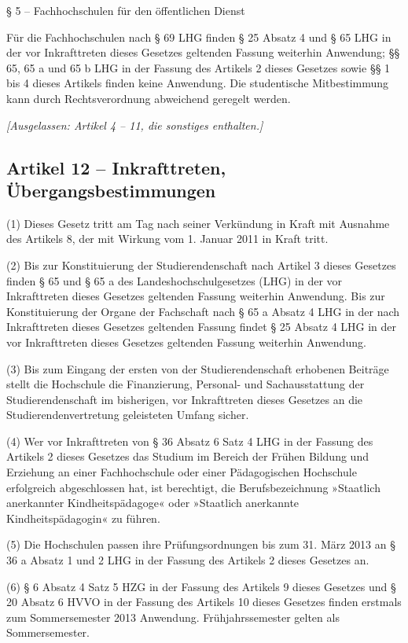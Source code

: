 \documentclass[
10pt,
a4paper,
twoside,								%
titlepage=false,							%
draft=false								%
]{scrartcl}
\begin{document}
§ 5 – Fachhochschulen für den öffentlichen Dienst

Für die Fachhochschulen nach § 69 LHG finden § 25 Absatz 4 und § 65 LHG in der vor Inkrafttreten dieses Gesetzes geltenden Fassung weiterhin Anwendung; §§ 65, 65 a und 65 b LHG in der Fassung des Artikels 2 dieses Gesetzes sowie §§ 1 bis 4 dieses Artikels finden keine Anwendung. Die studentische Mitbestimmung kann durch Rechtsverordnung abweichend geregelt werden.


\bigskip
\emph{[Ausgelassen: Artikel 4 – 11, die sonstiges enthalten.]}


\subsection{Artikel 12 – Inkrafttreten, Übergangsbestimmungen}

(1) Dieses Gesetz tritt am Tag nach seiner Verkündung in Kraft mit Ausnahme des Artikels 8, der mit Wirkung vom 1. Januar 2011 in Kraft tritt.

(2) Bis zur Konstituierung der Studierendenschaft nach Artikel 3 dieses Gesetzes finden § 65 und § 65 a des Landeshochschulgesetzes (LHG) in der vor Inkrafttreten dieses Gesetzes geltenden Fassung weiterhin Anwendung. Bis zur Konstituierung der Organe der Fachschaft nach § 65 a Absatz 4 LHG in der nach Inkrafttreten dieses Gesetzes geltenden Fassung findet § 25 Absatz 4 LHG in der vor Inkrafttreten dieses Gesetzes geltenden Fassung weiterhin Anwendung. 

(3) Bis zum Eingang der ersten von der Studierendenschaft erhobenen Beiträge stellt die Hochschule die Finanzierung, Personal- und Sachausstattung der Studierendenschaft im bisherigen, vor Inkrafttreten dieses Gesetzes an die Studierendenvertretung geleisteten Umfang sicher.

(4) Wer vor Inkrafttreten von § 36 Absatz 6 Satz 4 LHG in der Fassung des Artikels 2 dieses Gesetzes das Studium im Bereich der Frühen Bildung und Erziehung an einer Fachhochschule oder einer Pädagogischen Hochschule erfolgreich abgeschlossen hat, ist berechtigt, die Berufsbezeichnung »Staatlich anerkannter Kindheitspädagoge« oder »Staatlich anerkannte Kindheitspädagogin« zu führen.

(5) Die Hochschulen passen ihre Prüfungsordnungen bis zum 31. März 2013 an § 36 a Absatz 1 und 2 LHG in der Fassung des Artikels 2 dieses Gesetzes an.

(6) § 6 Absatz 4 Satz 5 HZG in der Fassung des Artikels 9 dieses Gesetzes und § 20 Absatz 6 HVVO in der Fassung des Artikels 10 dieses Gesetzes finden erstmals zum Sommersemester 2013 Anwendung. Frühjahrssemester gelten als Sommersemester.
\end{document}
